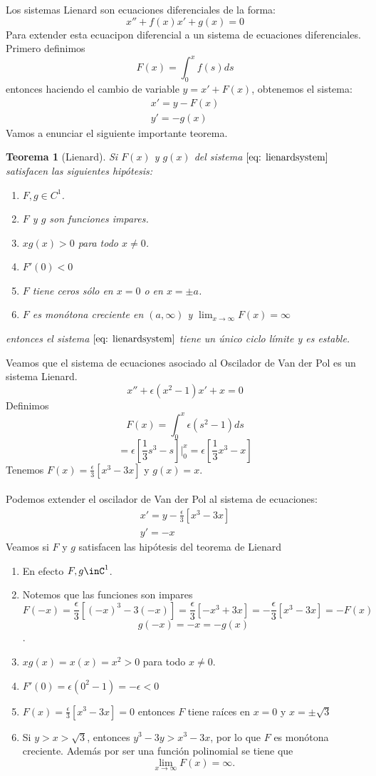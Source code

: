 \documentclass[12pt, a4paper]{report}
\newtheorem{theorem}{Teorema}
\begin{document}
Los sistemas Lienard son ecuaciones diferenciales de la forma:
\begin{equation}\label{eq: lienard}
	x''+f(x)x'+g(x)=0
\end{equation}
Para extender esta ecuacipon diferencial a un sistema de ecuaciones diferenciales. Primero definimos
$$F(x)=\int_0^xf(s)ds$$
entonces haciendo el cambio de variable $y=x'+F(x)$, obtenemos el sistema:
\begin{equation}\label{eq: lienardsystem}
	\begin{matrix}
		x'=y-F(x) \\
		y'=-g(x)
	\end{matrix}
\end{equation}
Vamos a enunciar el siguiente importante teorema.
\begin{theorem}[Lienard]
	Si $F(x)$ y $g(x)$ del sistema $\eqref{eq: lienardsystem}$ satisfacen las siguientes hipótesis:
	\begin{enumerate}
		\item $F,g\in C^1$.
		\item $F$ y $g$ son funciones impares.
		\item $xg(x)>0$ para todo $x\neq 0$.
		\item $F'(0)<0$
		\item $F$ tiene ceros sólo en $x=0$ o en $x=\pm a$.
		\item $F$ es monótona creciente en $(a,\infty)$ y $\lim_{x\to\infty}F(x)=\infty$
	\end{enumerate}
	entonces el sistema $\eqref{eq: lienardsystem}$ tiene un único ciclo límite y es estable.
\end{theorem}
Veamos que el sistema de ecuaciones asociado al Oscilador de Van der Pol es un sistema Lienard.
$$x''+\epsilon(x^2-1)x'+x=0$$
Definimos
$$F(x)=\int_0^x\epsilon(s^2-1)ds$$
$$=\epsilon[\frac{1}{3}s^3-s]| _0^x=\epsilon[\frac{1}{3}x^3-x]$$
Tenemos $F(x)=\frac{\epsilon}{3}[x^3-3x]$ y $g(x)=x$.\\
\\Podemos extender el oscilador de Van der Pol al sistema de ecuaciones:
$$
	\begin{matrix}
		x'=y-\frac{\epsilon}{3}[x^3-3x] \\
		y'=-x
	\end{matrix}
$$
Veamos si $F$ y $g$ satisfacen las hipótesis del teorema de Lienard
\begin{enumerate}
	\item En efecto $F,g\inC^1$.
	\item Notemos que las funciones son impares
	      $$F(-x)=\frac{\epsilon}{3}[(-x)^3-3(-x)]=\frac{\epsilon}{3}[-x^3+3x]=-\frac{\epsilon}{3}[x^3-3x]=-F(x)$$
	      $$g(-x)=-x=-g(x)$$.
	\item $xg(x)=x(x)=x^2>0$ para todo $x\neq 0$.
	\item $F'(0)=\epsilon(0^2-1)=-\epsilon<0$
	\item $F(x)=\frac{\epsilon}{3}[x^3-3x]=0$ entonces $F$ tiene raíces en $x=0$ y  $x=\pm \sqrt{3}$
	\item Si $y>x>\sqrt{3}$, entonces $y^3-3y>x^3-3x$, por lo que $F$ es monótona creciente. Además
	      por ser una función polinomial se tiene que
	      $$\lim_{x\to\infty}F(x)=\infty.$$
\end{enumerate}
\end{document}

